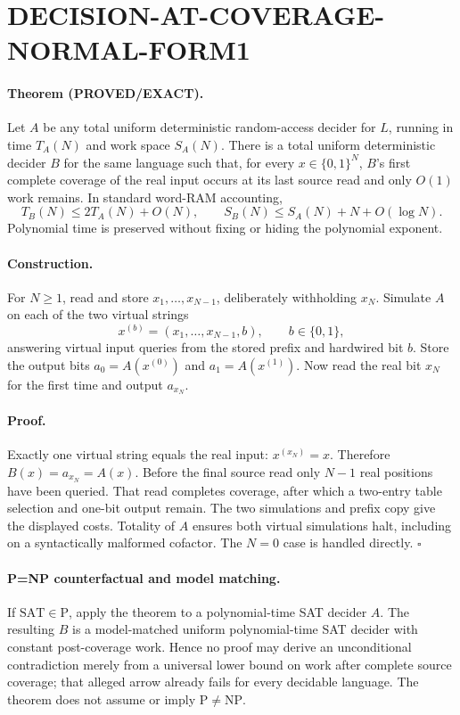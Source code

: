 \documentclass[11pt]{article}
\newcommand{\Status}[1]{\textbf{#1}}
\newcommand{\SAT}{\mathrm{SAT}}
\begin{document}
\section{DECISION-AT-COVERAGE-NORMAL-FORM1}
\paragraph{Theorem (\Status{PROVED/EXACT}).}
Let \(A\) be any total uniform deterministic random-access decider for \(L\),
running in time \(T_A(N)\) and work space \(S_A(N)\). There is a total uniform
deterministic decider \(B\) for the same language such that, for every
\(x\in\{0,1\}^N\), \(B\)'s first complete coverage of the real input occurs at
its last source read and only \(O(1)\) work remains. In standard word-RAM
accounting,
\[
 T_B(N)\le 2T_A(N)+O(N),\qquad
 S_B(N)\le S_A(N)+N+O(\log N).
\]
Polynomial time is preserved without fixing or hiding the polynomial exponent.

\paragraph{Construction.}
For \(N\ge1\), read and store \(x_1,\ldots,x_{N-1}\), deliberately withholding
\(x_N\). Simulate \(A\) on each of the two virtual strings
\[
 x^{(b)}=(x_1,\ldots,x_{N-1},b),\qquad b\in\{0,1\},
\]
answering virtual input queries from the stored prefix and hardwired bit
\(b\). Store the output bits \(a_0=A(x^{(0)})\) and
\(a_1=A(x^{(1)})\). Now read the real bit \(x_N\) for the first time and
output \(a_{x_N}\).

\paragraph{Proof.}
Exactly one virtual string equals the real input:
\(x^{(x_N)}=x\). Therefore \(B(x)=a_{x_N}=A(x)\). Before the final source
read only \(N-1\) real positions have been queried. That read completes
coverage, after which a two-entry table selection and one-bit output remain.
The two simulations and prefix copy give the displayed costs. Totality of
\(A\) ensures both virtual simulations halt, including on a syntactically
malformed cofactor. The \(N=0\) case is handled directly. \(\square\)

\paragraph{P=NP counterfactual and model matching.}
If \(\SAT\in\mathrm P\), apply the theorem to a polynomial-time SAT decider
\(A\). The resulting \(B\) is a model-matched uniform polynomial-time SAT
decider with constant post-coverage work. Hence no proof may derive an
unconditional contradiction merely from a universal lower bound on work after
complete source coverage; that alleged arrow already fails for every decidable
language. The theorem does not assume or imply \(\mathrm P\ne\mathrm{NP}\).
\end{document}

